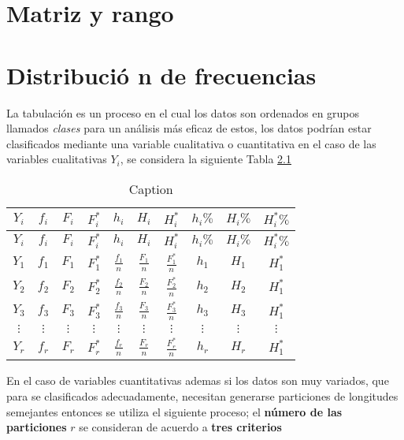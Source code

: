 \documentclass[10pt,]{krantz}
\theoremstyle{definition}
\theoremstyle{definition}
\theoremstyle{definition}
\theoremstyle{remark}
\begin{document}
\hypertarget{matriz-y-rango}{%
\chapter{Matriz y rango}\label{matriz-y-rango}}

\hypertarget{distribuciuxf3-n-de-frecuencias}{%
\chapter{Distribució n de frecuencias}\label{distribuciuxf3-n-de-frecuencias}}

La tabulación es un proceso en el cual los datos son ordenados en grupos llamados \emph{clases} para un análisis más eficaz de estos, los datos podrían estar clasificados mediante una variable cualitativa o cuantitativa en el caso de las variables cualitativas \(Y_i\), se considera la siguiente Tabla \ref{tab:ww}

\begin{longtable}[]{@{}cccccccccc@{}}
\caption{\label{tab:ww} Caption}\tabularnewline
\toprule
\(Y_i\) & \(f_i\) & \(F_i\) & \(F_i^*\) & \(h_i\) & \(H_i\) & \(H_i^*\) & \(h_i\%\) & \(H_i\%\) & \(H_i^*\%\)\tabularnewline
\midrule
\endfirsthead
\toprule
\(Y_i\) & \(f_i\) & \(F_i\) & \(F_i^*\) & \(h_i\) & \(H_i\) & \(H_i^*\) & \(h_i\%\) & \(H_i\%\) & \(H_i^*\%\)\tabularnewline
\midrule
\endhead
\(Y_1\) & \(f_1\) & \(F_1\) & \(F_1^*\) & \(\frac{f_1}{n}\) & \(\frac{F_1}{n}\) & \(\frac{F_1^*}{n}\) & \(h_1\) & \(H_1\) & \(H_1^*\)\tabularnewline
\(Y_2\) & \(f_2\) & \(F_2\) & \(F_2^*\) & \(\frac{f_2}{n}\) & \(\frac{F_2}{n}\) & \(\frac{F_2^*}{n}\) & \(h_2\) & \(H_2\) & \(H_1^*\)\tabularnewline
\(Y_3\) & \(f_3\) & \(F_3\) & \(F_3^*\) & \(\frac{f_3}{n}\) & \(\frac{F_3}{n}\) & \(\frac{F_3^*}{n}\) & \(h_3\) & \(H_3\) & \(H_1^*\)\tabularnewline
\(\vdots\) & \(\vdots\) & \(\vdots\) & \(\vdots\) & \(\vdots\) & \(\vdots\) & \(\vdots\) & \(\vdots\) & \(\vdots\) & \(\vdots\)\tabularnewline
\(Y_r\) & \(f_r\) & \(F_r\) & \(F_r^*\) & \(\frac{f_r}{n}\) & \(\frac{F_r}{n}\) & \(\frac{F_r^*}{n}\) & \(h_r\) & \(H_r\) & \(H_1^*\)\tabularnewline
\bottomrule
\end{longtable}

En el caso de variables cuantitativas ademas si los datos son muy variados, que para se clasificados adecuadamente, necesitan generarse particiones de longitudes semejantes entonces se utiliza el siguiente proceso; el \textbf{número de las particiones} \(r\) se consideran de acuerdo a \textbf{tres criterios}
\end{document}
